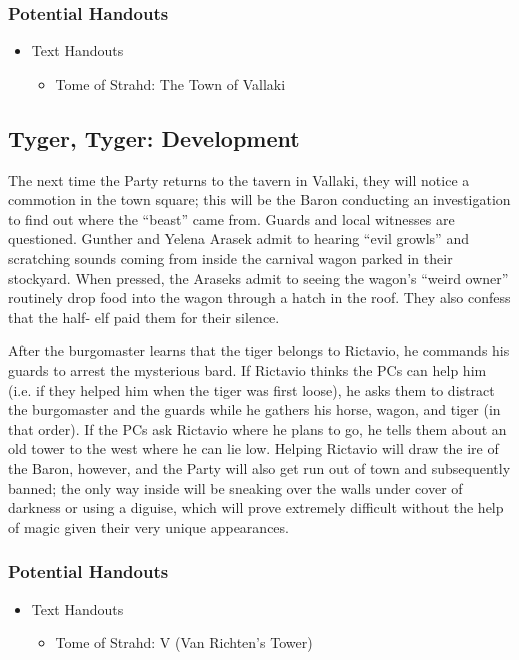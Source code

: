 \documentclass[a4paper,11pt]{article}
\begin{document}
\subsubsection{Potential Handouts}
\begin{itemize}
  \item Text Handouts
  \begin{itemize}
    \item Tome of Strahd: The Town of Vallaki
  \end{itemize}
\end{itemize}

\subsection{Tyger, Tyger: Development}
The next time the Party returns to the tavern in Vallaki, they will notice a commotion in the town square; this 
will be the Baron conducting an investigation to find out where the ``beast'' came from. Guards and local 
witnesses are questioned. Gunther and Yelena Arasek admit to hearing ``evil growls'' and scratching sounds coming 
from inside the carnival wagon parked in their stockyard. When pressed, the Araseks admit to seeing the wagon's 
``weird owner'' routinely drop food into the wagon through a hatch in the roof. They also confess that the half-
elf paid them for their silence.

After the burgomaster learns that the tiger belongs to Rictavio, he commands his guards to arrest the mysterious 
bard. If Rictavio thinks the PCs can help him (i.e. if they helped him when the tiger was first loose), he asks 
them to distract the burgomaster and the guards while he gathers his horse, wagon, and tiger (in that order). If 
the PCs ask Rictavio where he plans to go, he tells them about an old tower to the west where he can lie low.
Helping Rictavio will draw the ire of the Baron, however, and the Party will also get run out of town and
subsequently banned; the only way inside will be sneaking over the walls under cover of darkness or using a 
diguise, which will prove extremely difficult without the help of magic given their very unique appearances.
\subsubsection{Potential Handouts}
\begin{itemize}
  \item Text Handouts
  \begin{itemize}
    \item Tome of Strahd: V (Van Richten's Tower)
  \end{itemize}
\end{itemize}
\end{document}
